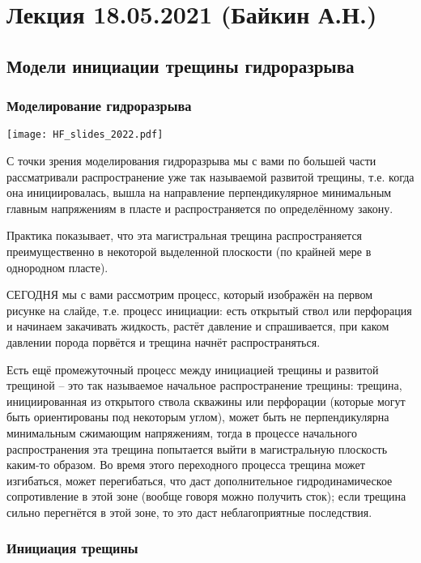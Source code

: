 \documentclass[main.tex]{subfiles}
\begin{document}

\section{Лекция 18.05.2021 (Байкин А.Н.)}

\subsection{Модели инициации трещины гидроразрыва}

\subsubsection{Моделирование гидроразрыва}

\texttt{[image: HF\_slides\_2022.pdf]}

С точки зрения моделирования гидроразрыва мы с вами по большей части рассматривали распространение уже так называемой развитой трещины, т.е. когда она инициировалась, вышла на направление перпендикулярное минимальным главным напряжениям в пласте и распространяется по определённому закону.

Практика показывает, что эта магистральная трещина распространяется преимущественно в некоторой выделенной плоскости (по крайней мере в однородном пласте).

СЕГОДНЯ мы с вами рассмотрим процесс, который изображён на первом рисунке на слайде, т.е. процесс инициации: есть открытый ствол или перфорация и начинаем закачивать жидкость, растёт давление и спрашивается, при каком давлении порода порвётся и трещина начнёт распространяться.

Есть ещё промежуточный процесс между инициацией трещины и развитой трещиной -- это так называемое начальное распространение трещины: трещина, инициированная из открытого ствола скважины или перфорации (которые могут быть ориентированы под некоторым углом), может быть не перпендикулярна минимальным сжимающим напряжениям, тогда в процессе начального распространения эта трещина попытается выйти в магистральную плоскость каким-то образом.
Во время этого переходного процесса трещина может изгибаться, может перегибаться, что даст дополнительное гидродинамическое сопротивление в этой зоне (вообще говоря можно получить сток); если трещина сильно перегнётся в этой зоне, то это даст неблагоприятные последствия.

\subsubsection{Инициация трещины}
\end{document}
